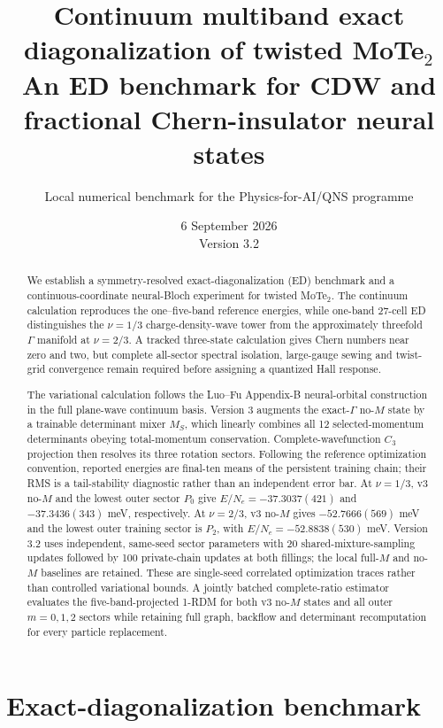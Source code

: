 \documentclass[10pt,twocolumn]{article}
\title{Continuum multiband exact diagonalization of twisted MoTe$_2$\\
\large An ED benchmark for CDW and fractional Chern-insulator neural states}
\author{Local numerical benchmark for the Physics-for-AI/QNS programme}
\date{6 September 2026\\Version 3.2}
\begin{document}
\maketitle

\begin{abstract}
We establish a symmetry-resolved exact-diagonalization (ED) benchmark and a
continuous-coordinate neural-Bloch experiment for twisted MoTe$_2$.  The
continuum calculation reproduces the one--five-band reference energies, while
one-band 27-cell ED distinguishes the $\nu=1/3$ charge-density-wave tower from
the approximately threefold $\Gamma$ manifold at $\nu=2/3$.  A tracked
three-state calculation gives Chern numbers near zero and two, but complete
all-sector spectral isolation, large-gauge sewing and twist-grid convergence
remain required before assigning a quantized Hall response.

The variational calculation follows the Luo--Fu Appendix-B neural-orbital
construction in the full plane-wave continuum basis. Version 3 augments the
exact-$\Gamma$ no-$M$ state by a trainable determinant mixer $M_S$, which
linearly combines all 12 selected-momentum determinants obeying total-momentum
conservation. Complete-wavefunction $C_3$ projection then resolves its three
rotation sectors. Following the reference
optimization convention, reported energies are final-ten means of the
persistent training chain; their RMS is a tail-stability
diagnostic rather than an independent error bar. At $\nu=1/3$, v3 no-$M$ and
the lowest outer sector $P_0$ give $E/N_e=-37.3037(421)$ and
$-37.3436(343)$ meV, respectively. At $\nu=2/3$, v3 no-$M$ gives
$-52.7666(569)$ meV and the lowest outer training sector is $P_2$, with
$E/N_e=-52.8838(530)$ meV. Version 3.2 uses independent, same-seed sector
parameters with 20 shared-mixture-sampling updates followed by 100 private-chain
updates at both fillings; the local full-$M$ and no-$M$ baselines are retained.
These are single-seed correlated optimization
traces rather than controlled variational bounds. A jointly batched
complete-ratio estimator evaluates the
five-band-projected 1-RDM for both v3 no-$M$ states and all outer $m=0,1,2$
sectors while retaining full graph, backflow and determinant recomputation
for every particle replacement.
\end{abstract}

\part{Exact-diagonalization benchmark}
\end{document}
